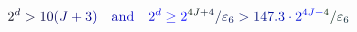 \documentclass[12pt]{article}
\begin{document}
\makeatletter
\renewcommand*{\@textcolor}[3]{%
  \protect\leavevmode
  \begingroup
    \color#1{#2}#3%
  \endgroup
}
\makeatother
\begin{displaymath}
\mathcolor[RGB]{0,0,15}{2} ^ { \mathcolor[RGB]{0,0,30}{d} } \mathcolor[RGB]{0,0,45}{>} \mathcolor[RGB]{0,0,60}{1} \mathcolor[RGB]{0,0,75}{0} \mathcolor[RGB]{0,0,90}{(} \mathcolor[RGB]{0,0,105}{J} \mathcolor[RGB]{0,0,120}{+} \mathcolor[RGB]{0,0,135}{3} \mathcolor[RGB]{0,0,150}{)} \quad \mathrm { \mathcolor[RGB]{0,0,165}{a} \mathcolor[RGB]{0,0,180}{n} \mathcolor[RGB]{0,0,195}{d} } \quad \mathcolor[RGB]{0,0,210}{2} ^ { \mathcolor[RGB]{0,0,225}{d} } \mathcolor[RGB]{0,0,240}{\ge} \mathcolor[RGB]{0,0,255}{2} ^ { \mathcolor[RGB]{0,15,0}{4} \mathcolor[RGB]{0,15,15}{J} \mathcolor[RGB]{0,15,30}{+} \mathcolor[RGB]{0,15,45}{4} } \mathcolor[RGB]{0,15,60}{/} \mathcolor[RGB]{0,15,75}{\varepsilon} _ { \mathcolor[RGB]{0,15,90}{6} } \mathcolor[RGB]{0,15,105}{>} \mathcolor[RGB]{0,15,120}{1} \mathcolor[RGB]{0,15,135}{4} \mathcolor[RGB]{0,15,150}{7} \mathcolor[RGB]{0,15,165}{.} \mathcolor[RGB]{0,15,180}{3} \mathcolor[RGB]{0,15,195}{\cdot} \mathcolor[RGB]{0,15,210}{2} ^ { \mathcolor[RGB]{0,15,225}{4} \mathcolor[RGB]{0,15,240}{J} \mathcolor[RGB]{0,15,255}{-} \mathcolor[RGB]{0,30,0}{4} } \mathcolor[RGB]{0,30,15}{/} \mathcolor[RGB]{0,30,30}{\varepsilon} _ { \mathcolor[RGB]{0,30,45}{6} }
\end{displaymath}
\end{document}
